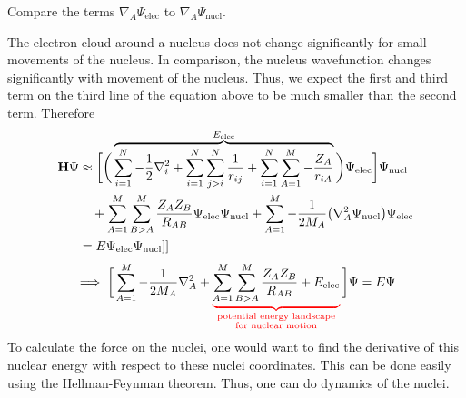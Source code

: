 \documentclass[12pt,a4paper,titlepage]{article}
\newcommand{\trm}[1]{\textrm{#1}} %
\begin{document}
Compare the terms $\nabla_{A}\Psi_{\trm{elec}}$ to $\nabla_{A}\Psi_{\trm{nucl}}$.
\begin{center}
\end{center}
The electron cloud around a nucleus does not change significantly for small movements of the nucleus. In comparison, the nucleus wavefunction changes significantly with movement of the nucleus. Thus, we expect the first and third term on the third line of the equation above to be much smaller than the second term. Therefore
\begin{equation}
\begin{aligned}
	\vb{H}\Psi&\approx\bigg[\bigg(\overbrace{\sum_{i=1}^{N}-\frac{1}{2}\nabla_{i}^{2}+\sum_{i=1}^{N}\sum_{j>i}^{N}\frac{1}{r_{ij}}+\sum_{i=1}^{N}\sum_{A=1}^{M}-\frac{Z_{A}}{r_{iA}}}^{E_{\trm{elec}}}\bigg)\Psi_{\trm{elec}}\bigg]\Psi_{\trm{nucl}}\\
&\quad+\sum_{A=1}^{M}\sum_{B>A}^{M}\frac{Z_{A}Z_{B}}{R_{AB}}\Psi_{\trm{elec}}\Psi_{\trm{nucl}}+\sum_{A=1}^{M}-\frac{1}{2M_{A}}\qty(\nabla_{A}^{2}\Psi_{\trm{nucl}})\Psi_{\trm{elec}}\\
&=E\Psi_{\trm{elec}}\Psi_{\trm{nucl}}]]
\end{aligned}
\end{equation}
\begin{equation}
\implies\bigg[\sum_{A=1}^{M}-\frac{1}{2M_{A}}\nabla_{A}^{2}+\color{red}\underbrace{\color{black}\sum_{A=1}^{M}\sum_{B>A}^{M}\frac{Z_{A}Z_{B}}{R_{AB}}+E_{\trm{elec}}}_{\substack{\trm{potential energy landscape}\\\trm{for nuclear motion}}}\color{black}\bigg]\Psi=E\Psi
\end{equation}
To calculate the force on the nuclei, one would want to find the derivative of this nuclear energy with respect to these nuclei coordinates. This can be done easily using the Hellman-Feynman theorem. Thus, one can do dynamics of the nuclei.
\end{document}
